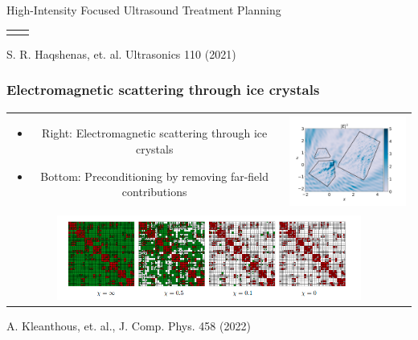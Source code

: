 \documentclass[dvipsnames,10pt]{beamer}
\begin{document}
\begin{frame}{High-Intensity Focused Ultrasound Treatment Planning}
\begin{center}
\begin{tabular}{cc}
\begin{minipage}{5cm}
\begin{small}
			

			
			\end{small}
		\end{minipage}
		\end{tabular}
	\end{center}
	
	
	\begin{small}
	S. R. Haqshenas, et. al. Ultrasonics 110 (2021)
	\end{small}
	
\end{frame}

\begin{frame}
	\frametitle{Electromagnetic scattering through ice crystals}
	
	\begin{center}
		\begin{tabular}{cc}
			\begin{minipage}{5cm}
				\vspace{-4cm}
				\begin{itemize}
					\item Right: Electromagnetic scattering through ice crystals
					\item Bottom: Preconditioning by removing far-field contributions
				\end{itemize}
			\end{minipage} &
		\includegraphics[width=5cm]{../figs/ice_crystal}\\
		\multicolumn{2}{c}{\includegraphics[width=10cm]{../figs/hmatrix_cut_off}}
		\end{tabular}
	\end{center}

	\begin{small}
		A. Kleanthous, et. al., J. Comp. Phys. 458 (2022)
	\end{small}
\end{frame}
\end{document}
